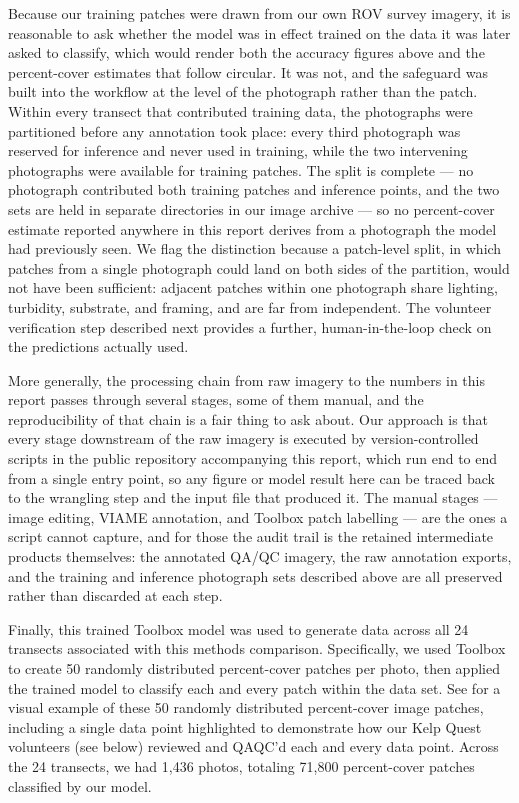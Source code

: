 \documentclass[11pt]{article}
\newcommand{\boxedref}[2]{%
	\begingroup
	\setlength{\fboxrule}{0.8pt}%
	\setlength{\fboxsep}{1.5pt}%
	\textcolor{linkcyan}{%
		\fbox{%
			\textcolor{black}{%
				\hyperref[#2]{#1~\ref*{#2}}%
			}%
		}%
	}%
	\endgroup
}
\newcommand{\figref}[1]{\boxedref{Fig.}{#1}}\newcommand{\tabref}[1]{\boxedref{Table}{#1}}
\begin{document}
Because our training patches were drawn from our own ROV survey imagery, it is
reasonable to ask whether the model was in effect trained on the data it was
later asked to classify, which would render both the accuracy figures above
and the percent-cover estimates that follow circular.
It was not, and the safeguard was built into the workflow at the level of the
photograph rather than the patch.
Within every transect that contributed training data, the photographs were
partitioned before any annotation took place: every third photograph was
reserved for inference and never used in training, while the two intervening
photographs were available for training patches.
The split is complete --- no photograph contributed both training patches and
inference points, and the two sets are held in separate directories in our
image archive --- so no percent-cover estimate reported anywhere in this report
derives from a photograph the model had previously seen.
We flag the distinction because a patch-level split, in which patches from a
single photograph could land on both sides of the partition, would not have
been sufficient: adjacent patches within one photograph share lighting,
turbidity, substrate, and framing, and are far from independent.
The volunteer verification step described next provides a further,
human-in-the-loop check on the predictions actually used.

More generally, the processing chain from raw imagery to the numbers in this
report passes through several stages, some of them manual, and the
reproducibility of that chain is a fair thing to ask about.
Our approach is that every stage downstream of the raw imagery is executed by
version-controlled scripts in the public repository accompanying this report,
which run end to end from a single entry point, so any figure or model result
here can be traced back to the wrangling step and the input file that produced
it.
The manual stages --- image editing, VIAME annotation, and Toolbox patch
labelling --- are the ones a script cannot capture, and for those the audit
trail is the retained intermediate products themselves: the annotated QA/QC
imagery, the raw annotation exports, and the training and inference photograph
sets described above are all preserved rather than discarded at each step.

Finally, this trained Toolbox model was used to generate data across all 24 
transects associated with this methods comparison. 
Specifically, we used Toolbox to create 50 randomly distributed percent-cover 
patches per photo, then applied the trained model to classify each and every 
patch within the data set.
See \figref{fig:image_sampling} for a visual example of these 50 randomly 
distributed percent-cover image patches, including a single data point 
highlighted to demonstrate how our Kelp Quest volunteers (see below) reviewed 
and QAQC'd each and every data point.  
Across the 24 transects, we had 1,436 photos, totaling 71,800 percent-cover 
patches classified by our model. 
\end{document}

